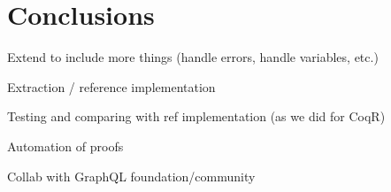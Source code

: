 \section{Conclusions}
\label{sec:conclusion}




Extend to include more things (handle errors, handle variables, etc.)

Extraction / reference implementation

Testing and comparing with ref implementation (as we did for CoqR)

Automation of proofs

Collab with GraphQL foundation/community

